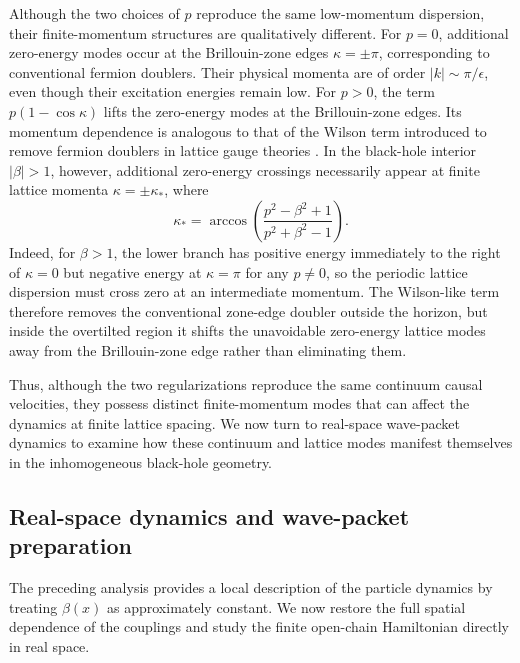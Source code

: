\documentclass[reprint,amsmath,amssymb,aps,showkeys,superscriptaddress]{revtex4-2}
\begin{document}
Although the two choices of $p$ reproduce the same low-momentum
dispersion, their finite-momentum structures are qualitatively
different. For $p=0$, additional zero-energy modes occur at the
Brillouin-zone edges $\kappa=\pm\pi$, corresponding to conventional
fermion doublers. Their physical momenta are of order
$|k|\sim\pi/\epsilon$, even though their excitation energies remain
low. For $p>0$, the term $p(1-\cos\kappa)$ lifts the zero-energy modes at
the Brillouin-zone edges. Its momentum dependence is analogous to
that of the Wilson term introduced to remove fermion doublers in
lattice gauge theories \cite{Wilson1974}. In the black-hole interior $|\beta|>1$, however,
additional zero-energy crossings necessarily appear at finite lattice
momenta $\kappa=\pm\kappa_\ast$, where
\begin{equation}
  \kappa_\ast
  =
  \arccos\left(
    \frac{p^2-\beta^2+1}
         {p^2+\beta^2-1}
  \right).
  \label{eq:finite_momentum_crossing}
\end{equation}
Indeed, for $\beta>1$, the lower branch has positive energy
immediately to the right of $\kappa=0$ but negative energy at
$\kappa=\pi$ for any $p\neq 0$, so the periodic lattice dispersion must
cross zero at an intermediate momentum. The Wilson-like term
therefore removes the conventional zone-edge doubler outside the
horizon, but inside the overtilted region it shifts the unavoidable
zero-energy lattice modes away from the Brillouin-zone edge rather
than eliminating them.

Thus, although the two regularizations reproduce the same continuum
causal velocities, they possess distinct finite-momentum modes that
can affect the dynamics at finite lattice spacing. We now turn to
real-space wave-packet dynamics to examine how these continuum and
lattice modes manifest themselves in the inhomogeneous black-hole
geometry.

\subsection{Real-space dynamics and wave-packet preparation}
\label{subsec:real_space}

The preceding analysis provides a local description of the particle
dynamics by treating $\beta(x)$ as approximately constant. We now
restore the full spatial dependence of the couplings and study the
finite open-chain Hamiltonian directly in real space.
\end{document}
